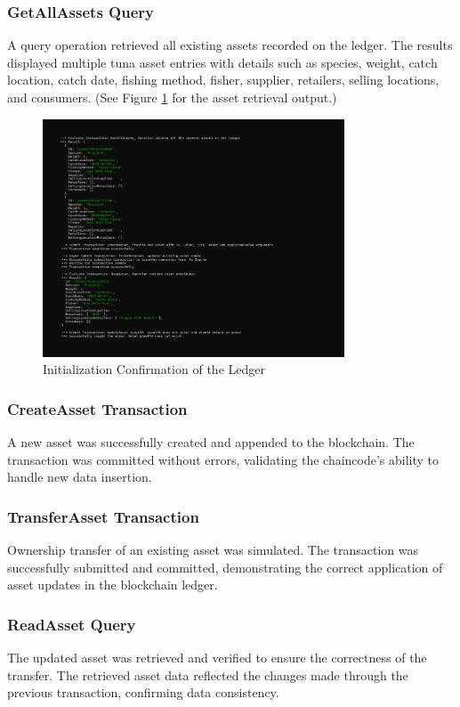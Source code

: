 \subsubsection{GetAllAssets Query}
A query operation retrieved all existing assets recorded on the ledger. The results displayed multiple tuna asset entries with details such as species, weight, catch location, catch date, fishing method, fisher, supplier, retailers, selling locations, and consumers.
(See Figure \ref{fig:getallledger} for the asset retrieval output.)

\begin{figure}[H]
	\centering
	\includegraphics[width=0.8\textwidth]{chaincode_security2.png} %
	\caption{Initialization Confirmation of the Ledger}
	\label{fig:getallledger}
\end{figure}

\subsubsection{CreateAsset Transaction}
A new asset was successfully created and appended to the blockchain. The transaction was committed without errors, validating the chaincode’s ability to handle new data insertion.

\subsubsection{TransferAsset Transaction}
Ownership transfer of an existing asset was simulated. The transaction was successfully submitted and committed, demonstrating the correct application of asset updates in the blockchain ledger.

\subsubsection{ReadAsset Query}
The updated asset was retrieved and verified to ensure the correctness of the transfer. The retrieved asset data reflected the changes made through the previous transaction, confirming data consistency.

